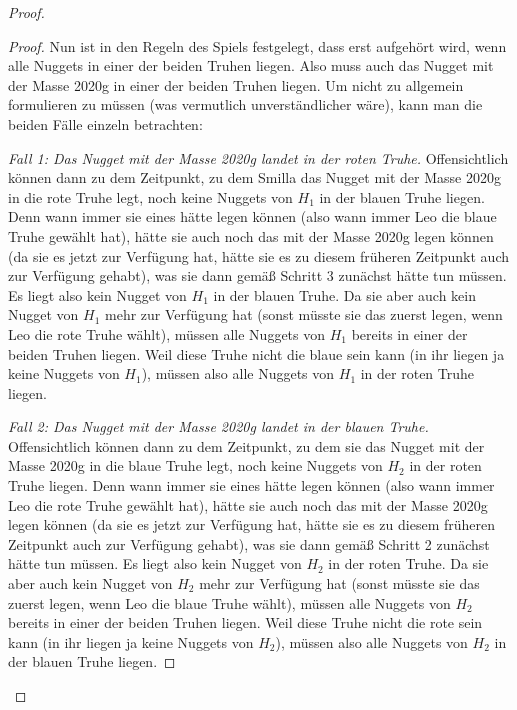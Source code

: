 \begin{proof}
\begin{proof}
        Nun ist in den Regeln des Spiels festgelegt, dass erst aufgehört wird, wenn alle Nuggets in einer der beiden 
        Truhen liegen. Also muss auch das Nugget mit der Masse 2020g in einer der beiden Truhen liegen. Um nicht zu 
        allgemein formulieren zu müssen (was vermutlich unverständlicher wäre), kann man die beiden Fälle einzeln 
        betrachten:

        \textit{Fall 1: Das Nugget mit der Masse 2020g landet in der roten Truhe.} Offensichtlich können dann zu dem 
        Zeitpunkt, zu dem Smilla das Nugget mit der Masse 2020g in die rote Truhe legt, noch keine Nuggets von $H_1$ in 
        der blauen Truhe liegen. Denn wann immer sie eines hätte legen können (also wann immer Leo die blaue Truhe 
        gewählt hat), hätte sie auch noch das mit der Masse 2020g legen können (da sie es jetzt zur Verfügung hat, 
        hätte sie es zu diesem früheren Zeitpunkt auch zur Verfügung gehabt), was sie dann gemäß Schritt 3 zunächst 
        hätte tun müssen. Es liegt also kein Nugget von $H_1$ in der blauen Truhe. Da sie aber auch kein Nugget von 
        $H_1$ mehr zur Verfügung hat (sonst müsste sie das zuerst legen, wenn Leo die rote Truhe wählt), müssen alle 
        Nuggets von $H_1$ bereits in einer der beiden Truhen liegen. Weil diese Truhe nicht die blaue sein kann (in 
        ihr liegen ja keine Nuggets von $H_1$), müssen also alle Nuggets von $H_1$ in der roten Truhe liegen.

        \textit{Fall 2: Das Nugget mit der Masse 2020g landet in der blauen Truhe.} Offensichtlich können dann zu dem 
        Zeitpunkt, zu dem sie das Nugget mit der Masse 2020g in die blaue Truhe legt, noch keine Nuggets von $H_2$ in 
        der roten Truhe liegen. Denn wann immer sie eines hätte legen können (also wann immer Leo die rote Truhe 
        gewählt hat), hätte sie auch noch das mit der Masse 2020g legen können (da sie es jetzt zur Verfügung hat, 
        hätte sie es zu diesem früheren Zeitpunkt auch zur Verfügung gehabt), was sie dann gemäß Schritt 2 zunächst 
        hätte tun müssen. Es liegt also kein Nugget von $H_2$ in der roten Truhe. Da sie aber auch kein Nugget von 
        $H_2$ mehr zur Verfügung hat (sonst müsste sie das zuerst legen, wenn Leo die blaue Truhe wählt), müssen alle 
        Nuggets von $H_2$ bereits in einer der beiden Truhen liegen. Weil diese Truhe nicht die rote sein kann (in 
        ihr liegen ja keine Nuggets von $H_2$), müssen also alle Nuggets von $H_2$ in der blauen Truhe liegen.


\end{proof}
\end{proof}
